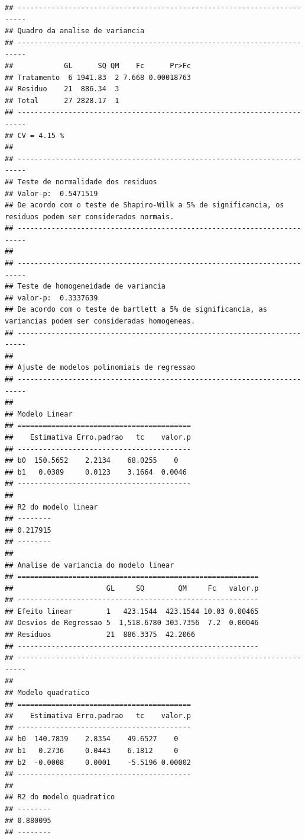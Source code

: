 \documentclass[
]{book}
\begin{document}
\begin{verbatim}
## ------------------------------------------------------------------------
## Quadro da analise de variancia
## ------------------------------------------------------------------------
##            GL      SQ QM    Fc      Pr>Fc
## Tratamento  6 1941.83  2 7.668 0.00018763
## Residuo    21  886.34  3                 
## Total      27 2828.17  1                 
## ------------------------------------------------------------------------
## CV = 4.15 %
## 
## ------------------------------------------------------------------------
## Teste de normalidade dos residuos 
## Valor-p:  0.5471519 
## De acordo com o teste de Shapiro-Wilk a 5% de significancia, os residuos podem ser considerados normais.
## ------------------------------------------------------------------------
## 
## ------------------------------------------------------------------------
## Teste de homogeneidade de variancia 
## valor-p:  0.3337639 
## De acordo com o teste de bartlett a 5% de significancia, as variancias podem ser consideradas homogeneas.
## ------------------------------------------------------------------------
## 
## Ajuste de modelos polinomiais de regressao
## ------------------------------------------------------------------------
## 
## Modelo Linear
## =========================================
##    Estimativa Erro.padrao   tc    valor.p
## -----------------------------------------
## b0  150.5652    2.2134    68.0255    0   
## b1   0.0389     0.0123    3.1664  0.0046 
## -----------------------------------------
## 
## R2 do modelo linear
## --------
## 0.217915
## --------
## 
## Analise de variancia do modelo linear
## =========================================================
##                      GL     SQ        QM     Fc   valor.p
## ---------------------------------------------------------
## Efeito linear        1   423.1544  423.1544 10.03 0.00465
## Desvios de Regressao 5  1,518.6780 303.7356  7.2  0.00046
## Residuos             21  886.3375  42.2066               
## ---------------------------------------------------------
## ------------------------------------------------------------------------
## 
## Modelo quadratico
## =========================================
##    Estimativa Erro.padrao   tc    valor.p
## -----------------------------------------
## b0  140.7839    2.8354    49.6527    0   
## b1   0.2736     0.0443    6.1812     0   
## b2  -0.0008     0.0001    -5.5196 0.00002
## -----------------------------------------
## 
## R2 do modelo quadratico
## --------
## 0.880095
## --------

\end{verbatim}
\end{document}

